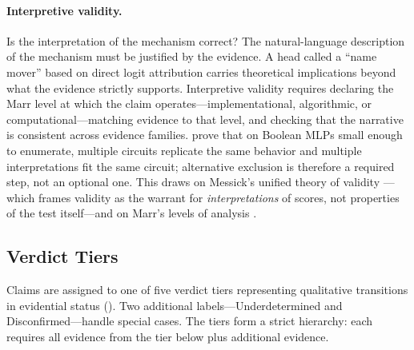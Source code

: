 \documentclass{article}
\begin{document}
\paragraph{Interpretive validity.} Is the interpretation of the mechanism correct? The natural-language description of the mechanism must be justified by the evidence. A head called a ``name mover'' based on direct logit attribution carries theoretical implications beyond what the evidence strictly supports. Interpretive validity requires declaring the Marr level at which the claim operates---implementational, algorithmic, or computational---matching evidence to that level, and checking that the narrative is consistent across evidence families. \citet{meloux2025everything} prove that on Boolean MLPs small enough to enumerate, multiple circuits replicate the same behavior and multiple interpretations fit the same circuit; alternative exclusion is therefore a required step, not an optional one. This draws on Messick's unified theory of validity \citep{messick1995validity}---which frames validity as the warrant for \emph{interpretations} of scores, not properties of the test itself---and on Marr's levels of analysis \citep{marr1982vision}.

\subsection{Verdict Tiers}
\label{sec:verdict-tiers}

Claims are assigned to one of five verdict tiers representing qualitative transitions in evidential status (). Two additional labels---Underdetermined and Disconfirmed---handle special cases. The tiers form a strict hierarchy: each requires all evidence from the tier below plus additional evidence.
\end{document}
